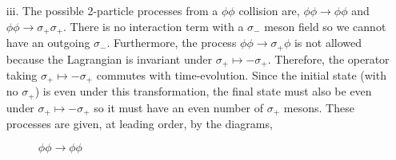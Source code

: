 \documentclass[12pt]{extarticle}
\begin{document}
\begin{enumerate}
\item[iii.]
The possible 2-particle processes from a $\phi \phi$ collision are, $\phi \phi \to \phi \phi$ and $\phi \phi \to \sigma_{+} \sigma_{+}$. There is no interaction term with a $\sigma_{-}$ meson field so we cannot have an outgoing $\sigma_{-}$. Furthermore, the process $\phi \phi \to \sigma_{+} \phi$ is not allowed because the Lagrangian is invariant under $\sigma_{+} \mapsto - \sigma_{+}$. Therefore, the operator taking $\sigma_{+} \mapsto - \sigma_{+}$ commutes with time-evolution. Since the initial state (with no $\sigma_{+}$) is even under this transformation, the final state must also be even under $\sigma_{+} \mapsto - \sigma_{+}$ so it must have an even number of $\sigma_{+}$ mesons. These processes are given, at leading order, by the diagrams,
\begin{figure}
\centering
\begin{minipage}{.5\textwidth}
  \centering
  
\caption{$\phi \phi \to \phi \phi$}
\end{minipage}%
\begin{minipage}{.5\textwidth}
  \centering
  

\end{minipage}
\end{figure}
\end{enumerate}
\end{document}
